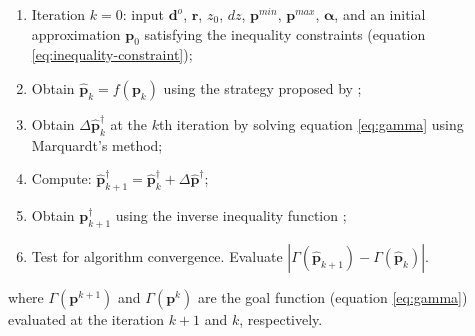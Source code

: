 \begin{enumerate}
	\item Iteration $k = 0$: input $\mathbf{d}^o$, $\mathbf{r}$, $z_0$, $dz$, $\mathbf{p}^{min}$, $\mathbf{p}^{max}$, $\boldsymbol{\alpha}$, and an initial approximation $\mathbf{p}_0$ satisfying the inequality constraints (equation \ref{eq:inequality-constraint});
	\item Obtain $\hat{\mathbf{p}}_k = f(\mathbf{p}_k)$ using the strategy proposed by \cite{barbosa-etal1999};
	\item Obtain $\Delta\hat{\mathbf{p}}^{\dagger}_k$ at the $k$th iteration by solving equation \ref{eq:gamma} using Marquardt’s method;
	\item Compute: $\hat{\mathbf{p}}_{k+1}^{\dagger} = \hat{\mathbf{p}}^{\dagger}_k + \Delta\hat{\mathbf{p}}^{\dagger}$;
	\item Obtain $\mathbf{p}_{k+1}^{\dagger}$ using the inverse inequality function \citep{barbosa-etal1999};
	\item Test for algorithm convergence. Evaluate $\left|\Gamma(\hat{\mathbf{p}}_{k+1}) - \Gamma(\hat{\mathbf{p}}_k)\right|$.
\end{enumerate}
where  $ \Gamma(\mathbf{p}^{k+1}) $ and $\Gamma(\mathbf{p}^{k})$ are the goal function (equation \ref{eq:gamma}) evaluated at the iteration $k+1$ and $k$, respectively.